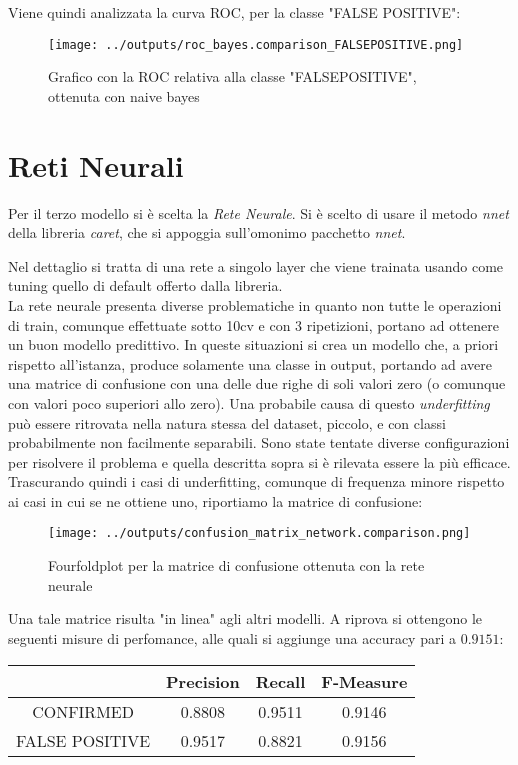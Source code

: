 Viene quindi analizzata la curva ROC, per la classe "FALSE POSITIVE":
\begin{figure}[H]
    \centering
    \texttt{[image: ../outputs/roc\_bayes.comparison\_FALSEPOSITIVE.png]}
    \caption{Grafico con la ROC relativa alla classe "FALSEPOSITIVE", ottenuta con 
    naive bayes}
\end{figure}
\section{Reti Neurali}
Per il terzo modello si è scelta la \textit{Rete Neurale}.
Si è scelto di usare il metodo \textit{nnet} della libreria \textit{caret}, 
che si appoggia sull'omonimo pacchetto \textit{nnet}.

Nel dettaglio si tratta di una rete a singolo layer che viene trainata 
usando come tuning quello di default offerto dalla libreria.\\
La rete neurale presenta diverse problematiche in quanto non tutte le operazioni
di train, comunque effettuate sotto 10cv e con 3 ripetizioni, portano ad 
ottenere un buon modello predittivo. In queste situazioni si crea un modello 
che, a priori rispetto all'istanza, produce solamente una classe in output, 
portando ad avere una matrice di confusione con una delle due righe di soli 
valori zero (o comunque con valori poco superiori allo zero). Una probabile 
causa di questo
\textit{underfitting} può essere ritrovata nella natura stessa del dataset, 
piccolo, e con classi probabilmente non facilmente separabili. 
Sono state tentate diverse configurazioni per risolvere il problema e quella 
descritta sopra si è rilevata essere la più efficace.\\
Trascurando quindi i casi di underfitting, comunque 
di frequenza minore rispetto ai casi in cui se ne ottiene uno, riportiamo 
la matrice di confusione:
\begin{figure}[H]
    \centering
    \texttt{[image: ../outputs/confusion\_matrix\_network.comparison.png]}
    \caption{Fourfoldplot per la matrice di confusione ottenuta con la rete neurale}
\end{figure}
Una tale matrice risulta "in linea" agli altri modelli. 
A riprova si ottengono le seguenti misure di perfomance, alle quali si aggiunge 
una accuracy pari a $0.9151$:
\begin{center}
    \begin{tabular}{| c | c c c |} 
    \hline
    & Precision & Recall & F-Measure \\ [0.5ex] 
    \hline\hline
    CONFIRMED  & 0.8808 & 0.9511 & 0.9146 \\ 
    \hline
    FALSE POSITIVE & 0.9517 & 0.8821 & 0.9156 \\ 
    \hline
    \end{tabular}
\end{center}

